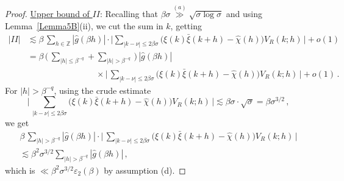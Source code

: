 \documentclass[11pt]{amsart}
\numberwithin{equation}{section}
\def\ep{{\varepsilon}}
\newcommand{\bZ}{\mathbb Z}
\begin{document}
\begin{proof}
\medskip\noindent\underline{Upper bound of $II$}:
Recalling that $\beta\sigma \stackrel{(a)}\gg \sqrt{\sigma\log\sigma}$
and using Lemma~\ref{Lemma5B}(ii), we cut the sum in $k$, getting
\begin{align*}
|II| &\lesssim \beta\, \sum_{h\in\bZ} |\widehat{g}(\beta h)| \cdot
\bigl| \sum_{|k-\nu|\le 2\beta\sigma}
\bigl( \xi(k)\bar\xi(k+h) - \widehat{\chi}(h) \bigr) V_R(k; h)\, \bigr| + o(1) \\
&= \beta\, \bigl(\, \sum_{|h|\le \beta^{-q}} + \sum_{|h|>\beta^{-q}} \,\bigr)\,
|\widehat{g}(\beta h)| \\ &\qquad\qquad\qquad\qquad \times
\bigl|\, \sum_{|k-\nu|\le 2\beta\sigma}
\bigl( \xi(k)\bar\xi(k+h) - \widehat{\chi}(h) \bigr) V_R(k; h) \,\bigr| + o(1)\,.
\end{align*}
For $|h|>\beta^{-q}$, using the crude estimate
\[
\bigl|\, \sum_{|k-\nu|\le 2\beta\sigma}
\bigl( \xi(k)\bar\xi(k+h) - \widehat{\chi}(h) \bigr) V_R(k; h) \,\bigr|
\lesssim \beta\sigma \cdot \sqrt{\sigma} = \beta\sigma^{3/2}\,,
\]
we get
\begin{multline*}
\beta\, \sum_{|h|> \beta^{-q}}
|\widehat{g}(\beta h)| \cdot
\bigl|\, \sum_{|k-\nu|\le 2\beta\sigma}
\bigl( \xi(k)\bar\xi(k+h) - \widehat{\chi}(h) \bigr) V_R(k; h) \,\bigr|
\\
\lesssim \beta^2\sigma^{3/2} \sum_{|h|> \beta^{-q}}
|\widehat{g}(\beta h)|\,,
\end{multline*}
which is $\ll \beta^2\sigma^{3/2}\ep_2(\beta)$ by assumption (d).


\end{proof}
\end{document}
